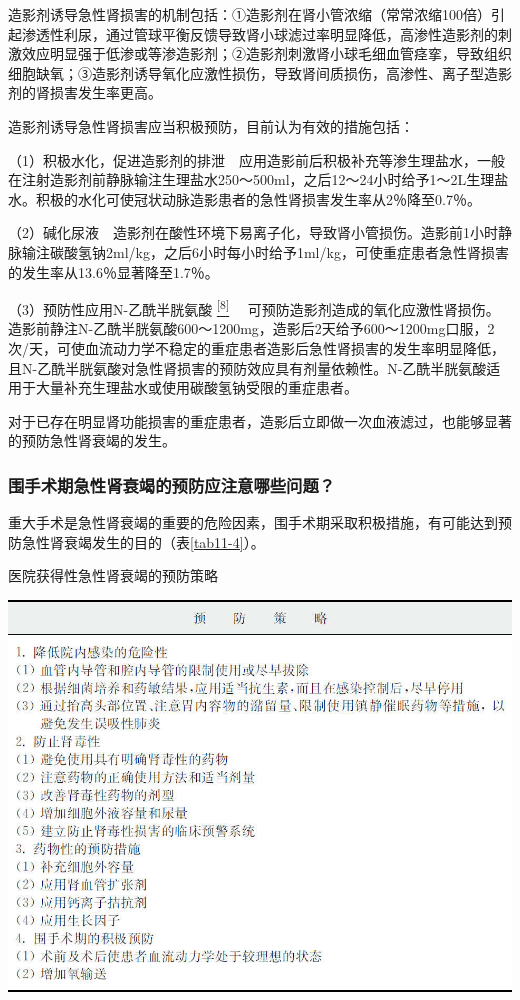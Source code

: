 造影剂诱导急性肾损害的机制包括：①造影剂在肾小管浓缩（常常浓缩100倍）引起渗透性利尿，通过管球平衡反馈导致肾小球滤过率明显降低，高渗性造影剂的刺激效应明显强于低渗或等渗造影剂；②造影剂刺激肾小球毛细血管痉挛，导致组织细胞缺氧；③造影剂诱导氧化应激性损伤，导致肾间质损伤，高渗性、离子型造影剂的肾损害发生率更高。

造影剂诱导急性肾损害应当积极预防，目前认为有效的措施包括：

（1）积极水化，促进造影剂的排泄　应用造影前后积极补充等渗生理盐水，一般在注射造影剂前静脉输注生理盐水250～500ml，之后12～24小时给予1～2L生理盐水。积极的水化可使冠状动脉造影患者的急性肾损害发生率从2％降至0.7％。

（2）碱化尿液　造影剂在酸性环境下易离子化，导致肾小管损伤。造影前1小时静脉输注碳酸氢钠2ml/kg，之后6小时每小时给予1ml/kg，可使重症患者急性肾损害的发生率从13.6％显著降至1.7％。

（3）预防性应用N-乙酰半胱氨酸
\protect\hyperlink{text00017.htmlux5cux23ch8-16}{\textsuperscript{{[}8{]}}}
　可预防造影剂造成的氧化应激性肾损伤。造影前静注N-乙酰半胱氨酸600～1200mg，造影后2天给予600～1200mg口服，2次/天，可使血流动力学不稳定的重症患者造影后急性肾损害的发生率明显降低，且N-乙酰半胱氨酸对急性肾损害的预防效应具有剂量依赖性。N-乙酰半胱氨酸适用于大量补充生理盐水或使用碳酸氢钠受限的重症患者。

对于已存在明显肾功能损害的重症患者，造影后立即做一次血液滤过，也能够显著的预防急性肾衰竭的发生。

\subsubsection{围手术期急性肾衰竭的预防应注意哪些问题？}

重大手术是急性肾衰竭的重要的危险因素，围手术期采取积极措施，有可能达到预防急性肾衰竭发生的目的（表\ref{tab11-4}）。

\begin{table}[htbp]
\centering
\caption{医院获得性急性肾衰竭的预防策略}
\label{tab11-4}
\includegraphics{./images/Image00092.jpg}
\end{table}

